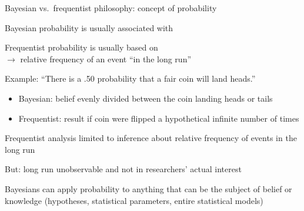 \renewcommand{\Source}{\textcite{ZyphurOswald2013}}
\begin{frame}{Bayesian vs.\ frequentist philosophy: concept of probability}
\begin{witemize}
    \item Bayesian probability is usually associated with 
    \item Frequentist probability is usually based on \\
    $\rightarrow$ relative frequency of an event ``in the long run''
    \item Example: ``There is a .50 probability that a fair coin will land heads.''\\
    \begin{itemize}
      \item Bayesian: belief evenly divided between the coin landing heads or tails
      \item Frequentist: result if coin were flipped a hypothetical infinite number of times
    \end{itemize}
    \item Frequentist analysis limited to inference about relative frequency of events in the long run
    \item But: long run unobservable and not in researchers' actual interest
    \item Bayesians can apply probability to anything that can be the subject of belief or knowledge (hypotheses, statistical parameters, entire statistical models)
\end{witemize}
\end{frame}

